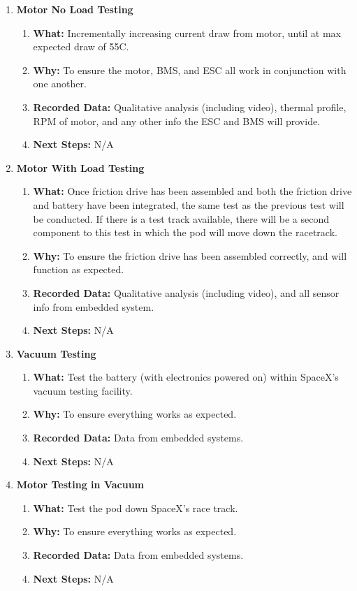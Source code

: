 \documentclass{report}
\begin{document}
    \begin{enumerate}
        \item \textbf{Motor No Load Testing}
        \begin{enumerate}
            \item \textbf{What: }Incrementally increasing current draw from motor, until at max expected draw of 55C.
            \item \textbf{Why: }To ensure the motor, BMS, and ESC all work in conjunction with one another.
            \item \textbf{Recorded Data: }Qualitative analysis (including video), thermal profile, RPM of motor, and any other info the ESC and BMS will provide.
            \item \textbf{Next Steps: }N/A
        \end{enumerate}
        \item \textbf{Motor With Load Testing}
        \begin{enumerate}
            \item \textbf{What: }Once friction drive has been assembled and both the friction drive and battery have been integrated, the same test as the previous test will be conducted. If there is a test track available, there will be a second component to this test in which the pod will move down the racetrack.
            \item \textbf{Why: }To ensure the friction drive has been assembled correctly, and will function as expected.
            \item \textbf{Recorded Data: }Qualitative analysis (including video), and all sensor info from embedded system.
            \item \textbf{Next Steps: }N/A
        \end{enumerate}
        \item \textbf{Vacuum Testing}
        \begin{enumerate}
            \item \textbf{What: }Test the battery (with electronics powered on) within SpaceX’s vacuum testing facility.
            \item \textbf{Why: }To ensure everything works as expected.
            \item \textbf{Recorded Data: }Data from embedded systems.
            \item \textbf{Next Steps: }N/A
        \end{enumerate}
        \item \textbf{Motor Testing in Vacuum}
        \begin{enumerate}
            \item \textbf{What: }Test the pod down SpaceX’s race track.
            \item \textbf{Why: }To ensure everything works as expected.
            \item \textbf{Recorded Data: }Data from embedded systems.
            \item \textbf{Next Steps: }N/A
        \end{enumerate}
    \end{enumerate}
\end{document}
